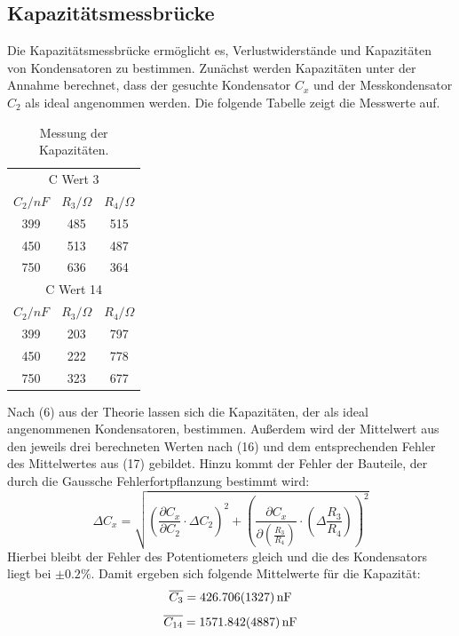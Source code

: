 \subsection{Kapazitätsmessbrücke}
Die Kapazitätsmessbrücke ermöglicht es, Verlustwiderstände und Kapazitäten von Kondensatoren zu bestimmen.
Zunächst werden Kapazitäten unter der Annahme berechnet, dass der gesuchte Kondensator $C_x$ und der Messkondensator $C_2$ als ideal angenommen werden.
Die folgende Tabelle zeigt die Messwerte auf.

\begin{table}[h!]
    \begin{center}
      \caption{Messung der Kapazitäten.}
      \label{tab:Tabelle 2}
      \begin{tabular}{c|c|c} 
        \multicolumn{3}{c}{C Wert 3} \\
        \textbf{$C_2 / nF$ } & \textbf{$R_3 / \Omega$} & \textbf{$R_4 / \Omega$}\\
        \hline
        399 & 485 & 515\\
        450 & 513 & 487\\
        750 & 636 & 364\\
        \multicolumn{3}{c}{C Wert 14} \\
        \textbf{$C_2 / nF$ } & \textbf{$R_3 / \Omega$} & \textbf{$R_4 / \Omega$}\\
        \hline
        399 & 203 & 797\\
        450 & 222 & 778\\
        750 & 323 & 677\\
      \end{tabular}
    \end{center}
\end{table}
Nach (6) aus der Theorie lassen sich die Kapazitäten, der als ideal angenommenen Kondensatoren, bestimmen.
Außerdem wird der Mittelwert aus den jeweils drei berechneten Werten nach (16) und dem entsprechenden Fehler des Mittelwertes aus (17) gebildet.
Hinzu kommt der Fehler der Bauteile, der durch die Gaussche Fehlerfortpflanzung bestimmt wird:
\begin{equation}
    \Delta C_x = \sqrt{\left (\frac{\partial C_x}{\partial C_2}\cdot \Delta C_2 \right )^2 + \left (\frac{\partial C_x}{\partial \left (\frac{R_3}{R_4}\right )} \cdot \left (\Delta \frac{R_3}{R_4}\right )\right )^2}
\end{equation}
Hierbei bleibt der Fehler des Potentiometers gleich und die des Kondensators liegt bei $\pm 0.2 \%$.
Damit ergeben sich folgende Mittelwerte für die Kapazität:
\begin{equation}
    \overline{C_\text{3}} = \SI{426,706 \pm 1,327}{nF} \notag 
\end{equation}
\begin{equation}
    \overline{C_\text{14}} = \SI{1571,842 \pm 4,887}{nF} \notag 
\end{equation}

